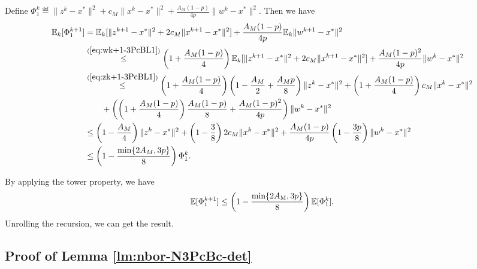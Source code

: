 \documentclass[11pt]{article}
\begin{document}
	Define $\Phi_1^k \eqdef \|z^k-x^*\|^2 + c_M\|x^k-x^*\|^2 + \frac{A_M(1-p)}{4p} \|w^k-x^*\|^2$. Then we have 
	\begin{align*}
		\mathbb{E}_k[\Phi_1^{k+1}] & = \mathbb{E}_k  [\|z^{k+1}-x^*\|^2 + 2c_M \|x^{k+1}-x^*\|^2 ] + \frac{A_M(1-p)}{4p} \mathbb{E}_k\|w^{k+1}-x^*\|^2 \\ 
		& \overset{(\ref{eq:wk+1-3PcBL1})}{\leq} \left(  1 + \frac{A_M(1-p)}{4}  \right) \mathbb{E}_k  [\|z^{k+1}-x^*\|^2 + 2c_M \|x^{k+1}-x^*\|^2 ] + \frac{A_M(1-p)^2}{4p} \|w^k-x^*\|^2 \\ 
		& \overset{(\ref{eq:zk+1-3PcBL1})}{\leq} \left(  1 + \frac{A_M(1-p)}{4}  \right) \left(  1 - \frac{A_M}{2} + \frac{A_M p}{8}  \right) \|z^k-x^*\|^2 + \left(  1 + \frac{A_M(1-p)}{4}  \right) c_M \|x^k-x^*\|^2 \\ 
		& \qquad + \left(  \left(  1 + \frac{A_M(1-p)}{4}  \right) \frac{A_M(1-p)}{8} +  \frac{A_M(1-p)^2}{4p}  \right) \|w^k-x^*\|^2 \\ 
		& \leq \left(  1 - \frac{A_M}{4}  \right) \|z^k-x^*\|^2 + \left(  1 - \frac{3}{8}  \right) 2c_M \|x^k-x^*\|^2 + \frac{A_M(1-p)}{4p} \left(  1- \frac{3p}{8}  \right) \|w^k-x^*\|^2 \\ 
		& \leq \left(  1 - \frac{\min\{2A_M, 3p\}}{8}  \right) \Phi_1^k. 
	\end{align*}
	
	By applying the tower property, we have 
	$$
	\mathbb{E} [\Phi^{k+1}_1]  \leq \left(  1 - \frac{\min\{  2A_{\rm M}, 3p  \}}{8}  \right) \mathbb{E}[\Phi^k_1]. 
	$$
	Unrolling the recursion, we can get the result. 
	
	
	
	
	
	\subsection{Proof of Lemma \ref{lm:nbor-N3PcBc-det}}
	
\end{document}

